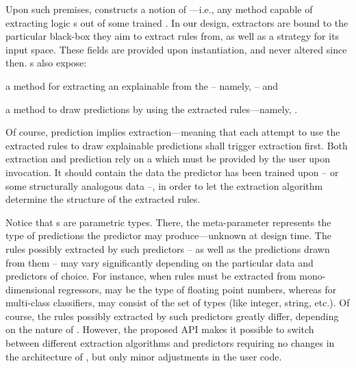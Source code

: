 \documentclass[12pt,a4paper,openright,twoside]{book}
\begin{document}
Upon such premises, \psyke{} constructs a notion of ---i.e., any method capable of extracting logic s out of some trained .
%
In our design, \psyke{} extractors are bound to the particular black-box  they aim to extract rules from, as well as a  strategy for its input space.
%
These fields are provided upon instantiation, and never altered since then.
%
s also expose:
%
\begin{inlinelist}
    \item a method for extracting an explainable  from the  -- namely,  -- and
    \item a method to draw predictions by using the extracted rules---namely, .
\end{inlinelist}
%
Of course, prediction implies extraction---meaning that each attempt to use the extracted rules to draw explainable predictions shall trigger extraction first.
%
Both extraction and prediction rely on a  which must be provided by the user upon invocation.
%
It should contain the data the predictor has been trained upon -- or some structurally analogous data --, in order to let the extraction algorithm determine the structure of the extracted rules.

Notice that s are parametric types.
%
There, the meta-parameter  represents the type of predictions the predictor may produce---unknown at design time.
%
The rules possibly extracted by such predictors -- as well as the predictions drawn from them -- may vary significantly depending on the particular data and predictors of choice.
%
For instance, when rules must be extracted from mono-dimensional regressors,  may be the type of floating point numbers, whereas for multi-class classifiers,  may consist of the set of types (like integer, string, etc.).
%
Of course, the rules possibly extracted by such predictors greatly differ, depending on the nature of .
%
However, the proposed API makes it possible to switch between different extraction algorithms and predictors requiring no changes in the architecture of \psyke{}, but only minor adjustments in the user code.
\end{document}
